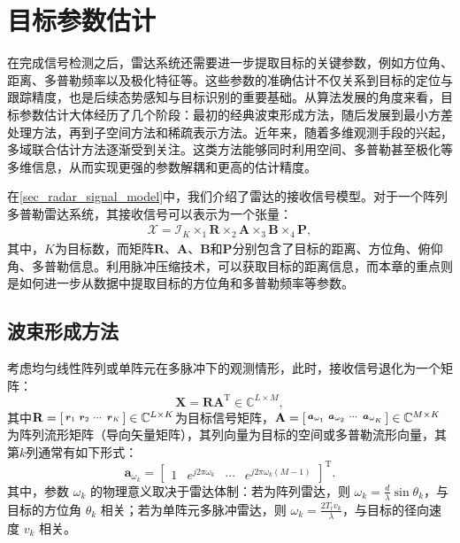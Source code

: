 \chapter{目标参数估计}

在完成信号检测之后，雷达系统还需要进一步提取目标的关键参数，例如方位角、距离、多普勒频率以及极化特征等。这些参数的准确估计不仅关系到目标的定位与跟踪精度，也是后续态势感知与目标识别的重要基础。从算法发展的角度来看，目标参数估计大体经历了几个阶段：最初的经典波束形成方法，随后发展到最小方差处理方法，再到子空间方法和稀疏表示方法。近年来，随着多维观测手段的兴起，多域联合估计方法逐渐受到关注。这类方法能够同时利用空间、多普勒甚至极化等多维信息，从而实现更强的参数解耦和更高的估计精度。

在\cref{sec_radar_signal_model}中，我们介绍了雷达的接收信号模型。对于一个阵列多普勒雷达系统，其接收信号可以表示为一个张量：
\[
    \begin{split}
        \mathcal{X} = \mathcal{I}_K \times_1 \mathbf{R} \times_2 \mathbf{A} \times_3 \mathbf{B} \times_4 \mathbf{P},
    \end{split}
\]
其中，\( K \)为目标数，而矩阵\( \mathbf{R} \)、\( \mathbf{A} \)、\( \mathbf{B} \)和\( \mathbf{P} \)分别包含了目标的距离、方位角、俯仰角、多普勒信息。利用脉冲压缩技术，可以获取目标的距离信息，而本章的重点则是如何进一步从数据中提取目标的方位角和多普勒频率等参数。

\section{波束形成方法}
考虑均匀线性阵列或单阵元在多脉冲下的观测情形，此时，接收信号退化为一个矩阵：
\[
    \mathbf{X} = \mathbf{R} \mathbf{A}^{\mathrm{T}} \in \mathbb{C}^{L \times M},
\]
其中\( \mathbf{R} = \begin{bsmallmatrix} \boldsymbol{r}_1 & \boldsymbol{r}_2 & \cdots & \boldsymbol{r}_K \end{bsmallmatrix} \in \mathbb{C}^{L \times K} \)为目标信号矩阵，\( \mathbf{A} = \begin{bsmallmatrix} \boldsymbol{a}_{\omega_1} & \boldsymbol{a}_{\omega_2} & \cdots & \boldsymbol{a}_{\omega_K} \end{bsmallmatrix} \in \mathbb{C}^{M \times K} \)为阵列流形矩阵（导向矢量矩阵），其列向量为目标的空间或多普勒流形向量，其第\( k \)列通常有如下形式：
\[
    \bm{a}_{\omega_k} = \begin{bmatrix}
        1 & e^{j 2 \pi \omega_k} & \cdots & e^{j 2 \pi \omega_k (M-1)}
    \end{bmatrix}^{\mathrm{T}}.
\]
其中，参数 $\omega_k$ 的物理意义取决于雷达体制：若为阵列雷达，则 $\omega_k = \frac{d}{\lambda}\sin \theta_k$，与目标的方位角 $\theta_k$ 相关；若为单阵元多脉冲雷达，则 $\omega_k = \frac{2 T_r v_k}{\lambda}$，与目标的径向速度 $v_k$ 相关。

